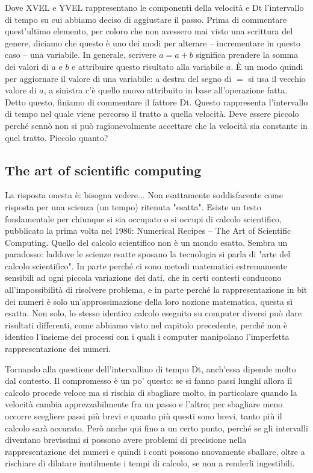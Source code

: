 Dove XVEL e YVEL rappresentano le componenti della velocità e Dt l'intervallo di tempo su cui abbiamo deciso di aggiustare il passo. Prima di commentare quest'ultimo elemento, per coloro che non avessero mai visto una scrittura del genere, diciamo che questo è uno dei modi per alterare – incrementare in questo caso – una variabile. In generale, scrivere $a=a+b$ significa prendere la somma dei valori di $a$ e $b$ e attribuire questo risultato alla variabile $a$. È un modo quindi per aggiornare il valore di una variabile: a destra del segno di $=$ si usa il vecchio valore di $a$, a sinistra c'è quello nuovo attribuito in base all'operazione fatta. Detto questo, finiamo di commentare il fattore Dt. Questo rappresenta l'intervallo di tempo nel quale viene percorso il tratto a quella velocità. Deve essere piccolo perché sennò non si può ragionevolmente accettare che la velocità sia constante in quel tratto. Piccolo quanto? 

\subsection{The art of scientific computing}

La risposta onesta è: bisogna vedere... Non esattamente soddisfacente come risposta per una scienza (un tempo) ritenuta "esatta". Esiste un testo fondamentale per chiunque si sia occupato o si occupi di calcolo scientifico, pubblicato la prima volta nel 1986: Numerical Recipes – The Art of Scientific Computing\cite{Press}. Quello del calcolo scientifico non è un mondo esatto. Sembra un paradosso: laddove le scienze esatte sposano la tecnologia si parla di "arte del calcolo scientifico". In parte perché ci sono metodi matematici estremamente sensibili ad ogni piccola variazione dei dati, che in certi contesti conducono all'impossibilità di risolvere problema, e in parte perché la rappresentazione in bit dei numeri è solo un'approssimazione della loro nozione matematica, questa sì esatta. Non solo, lo stesso identico calcolo eseguito su computer diversi può dare risultati differenti, come abbiamo visto nel capitolo precedente, perché non è identico l'insieme dei processi con i quali i computer manipolano l'imperfetta rappresentazione dei numeri.

Tornando alla questione dell'intervallino di tempo Dt, anch'essa dipende molto dal contesto. Il compromesso è un po' questo: se si fanno passi lunghi allora il calcolo procede veloce ma si rischia di sbagliare molto, in particolare quando la velocità cambia apprezzabilmente fra un passo e l'altro; per sbagliare meno occorre scegliere passi più brevi e quanto più questi sono brevi, tanto più il calcolo sarà accurato. Però anche qui fino a un certo punto, perché se gli intervalli diventano brevissimi si possono avere problemi di precisione nella rappresentazione dei numeri e quindi i conti possono nuovamente sballare, oltre a rischiare di dilatare inutilmente i tempi di calcolo, se non a renderli ingestibili.

